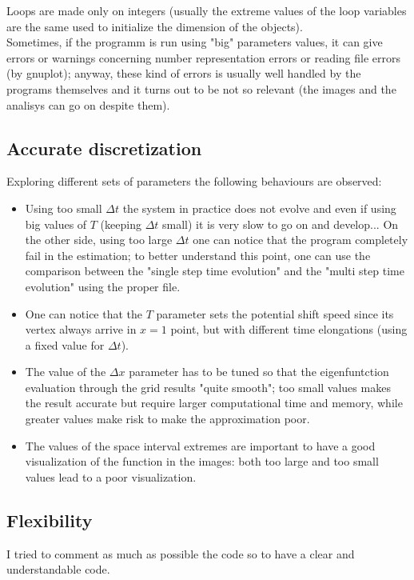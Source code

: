 \documentclass[12pt, a4paper, notitlepage]{report}
\begin{document}
Loops are made only on integers (usually the extreme values of the loop variables are the same used to initialize the dimension of the objects).\\
Sometimes, if the programm is run using "big" parameters values, it can give errors or warnings concerning number representation errors or reading file errors (by gnuplot); anyway, these kind of errors is usually well handled by the programs themselves and it turns out to be not so relevant (the images and the analisys can go on despite them).


\subsection*{Accurate discretization}

Exploring different sets of parameters the following behaviours are observed:
\begin{itemize}
	\item Using too small $\Delta t$ the system in practice does not evolve and even if using big values of $T$ (keeping $\Delta t$ small) it is very slow to go on and develop... On the other side, using too large $\Delta t$ one can notice that the program completely fail in the estimation; to better understand this point, one can use the comparison between the "single step time evolution" and the "multi step time evolution" using the proper file.
	\item One can notice that the $T$ parameter sets the potential shift speed since its vertex always arrive in $x=1$ point, but with different time elongations (using a fixed value for $\Delta t$).
	\item The value of the $\Delta x$ parameter has to be tuned so that the eigenfuntction evaluation through the grid results "quite smooth"; too small values makes the result accurate but require larger computational time and memory, while greater values make risk to make the approximation poor.
	\item The values of the space interval extremes are important to have a good visualization of the function in the images: both too large and too small values lead to a poor visualization.
\end{itemize}

\subsection*{Flexibility}

I tried to comment as much as possible the code so to have a clear and understandable code.
\end{document}
